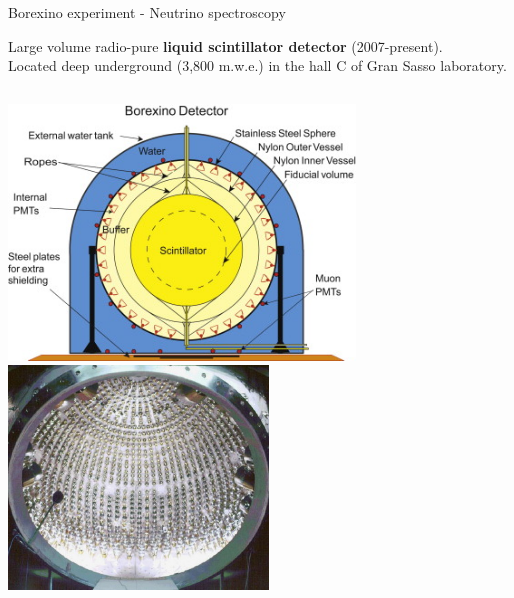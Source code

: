 %
%
%

\begin{frame}[t]{Borexino experiment - Neutrino spectroscopy}

 \vspace{-0.3cm}
 {\small
 Large volume radio-pure {\bf liquid scintillator detector} (2007-present).\\
 Located deep underground (3,800 m.w.e.) in the hall C of Gran Sasso laboratory.
 }
 \vspace{-0.5cm}
  \begin{columns}[T]
    \begin{column}{0.47\textwidth}
      \begin{center}
       \includegraphics[width=0.80\textwidth]{./images/3nu/solar/borexino_schematic}\\
       \includegraphics[width=0.60\textwidth]{./images/3nu/solar/borexino_stainless_steel}\\
      \end{center}
    \end{column}
    \begin{column}{0.53\textwidth}
        \begin{center}

\end{center}
\end{column}
\end{columns}
\end{frame}
